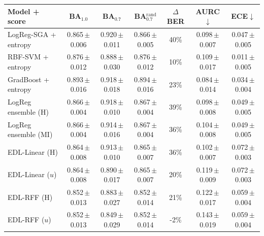 \begin{tabular}{lcccccc}\toprule
Model + score & BA$_{1.0}$ & BA$_{0.7}$ & BA$_{0.7}^{\text{rand}}$ & $\Delta$BER & AURC$\downarrow$ & ECE$\downarrow$\\\midrule
LogReg-SGA + entropy & 0.865\,{\scriptsize$\pm$0.006} & 0.920\,{\scriptsize$\pm$0.011} & 0.866\,{\scriptsize$\pm$0.005} & 40\% & 0.098\,{\scriptsize$\pm$0.007} & 0.047\,{\scriptsize$\pm$0.005}\\
RBF-SVM + entropy & 0.876\,{\scriptsize$\pm$0.012} & 0.888\,{\scriptsize$\pm$0.030} & 0.876\,{\scriptsize$\pm$0.012} & 10\% & 0.109\,{\scriptsize$\pm$0.017} & 0.011\,{\scriptsize$\pm$0.005}\\
GradBoost + entropy & 0.893\,{\scriptsize$\pm$0.016} & 0.918\,{\scriptsize$\pm$0.018} & 0.894\,{\scriptsize$\pm$0.016} & 23\% & 0.084\,{\scriptsize$\pm$0.014} & 0.034\,{\scriptsize$\pm$0.004}\\
LogReg ensemble (H) & 0.866\,{\scriptsize$\pm$0.004} & 0.918\,{\scriptsize$\pm$0.010} & 0.867\,{\scriptsize$\pm$0.004} & 39\% & 0.098\,{\scriptsize$\pm$0.008} & 0.049\,{\scriptsize$\pm$0.005}\\
LogReg ensemble (MI) & 0.866\,{\scriptsize$\pm$0.004} & 0.914\,{\scriptsize$\pm$0.016} & 0.867\,{\scriptsize$\pm$0.004} & 36\% & 0.104\,{\scriptsize$\pm$0.008} & 0.049\,{\scriptsize$\pm$0.005}\\
EDL-Linear (H) & 0.864\,{\scriptsize$\pm$0.008} & 0.913\,{\scriptsize$\pm$0.010} & 0.865\,{\scriptsize$\pm$0.007} & 36\% & 0.102\,{\scriptsize$\pm$0.007} & 0.072\,{\scriptsize$\pm$0.003}\\
EDL-Linear ($u$) & 0.864\,{\scriptsize$\pm$0.008} & 0.890\,{\scriptsize$\pm$0.017} & 0.865\,{\scriptsize$\pm$0.007} & 20\% & 0.119\,{\scriptsize$\pm$0.009} & 0.072\,{\scriptsize$\pm$0.003}\\
EDL-RFF (H) & 0.852\,{\scriptsize$\pm$0.013} & 0.883\,{\scriptsize$\pm$0.027} & 0.852\,{\scriptsize$\pm$0.014} & 21\% & 0.122\,{\scriptsize$\pm$0.017} & 0.059\,{\scriptsize$\pm$0.004}\\
EDL-RFF ($u$) & 0.852\,{\scriptsize$\pm$0.013} & 0.849\,{\scriptsize$\pm$0.029} & 0.852\,{\scriptsize$\pm$0.014} & -2\% & 0.143\,{\scriptsize$\pm$0.019} & 0.059\,{\scriptsize$\pm$0.004}\\
\bottomrule\end{tabular}